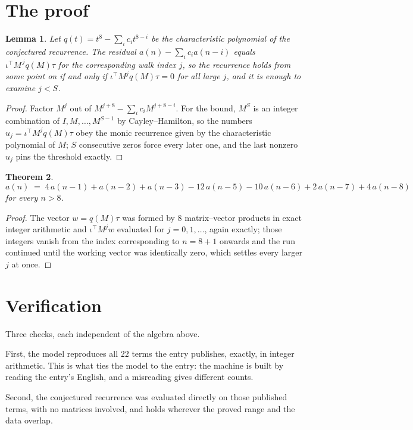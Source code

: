 \documentclass[11pt,a4paper]{article}
\theoremstyle{plain}
\newtheorem{theorem}{Theorem}
\newtheorem{lemma}[theorem]{Lemma}
\theoremstyle{definition}
\begin{document}
\section{The proof}

\begin{lemma}\label{lem:crit}
Let $q(t)=t^{8}-\sum_i c_it^{8-i}$ be the characteristic polynomial of the
conjectured recurrence. The residual $a(n)-\sum_ic_ia(n-i)$ equals
$\iota^{\!\top}M^{\,j}q(M)\tau$ for the corresponding walk index $j$, so the recurrence
holds from some point on if and only if $\iota^{\!\top}M^{j}q(M)\tau=0$ for all large $j$,
and it is enough to examine $j<S$.
\end{lemma}

\begin{proof}
Factor $M^{j}$ out of $M^{j+8}-\sum_ic_iM^{j+8-i}$. For the bound, $M^{S}$
is an integer combination of $I,M,\dots,M^{S-1}$ by Cayley--Hamilton, so the numbers
$u_j=\iota^{\!\top}M^{j}q(M)\tau$ obey the monic recurrence given by the characteristic
polynomial of $M$; $S$ consecutive zeros force every later one, and the last nonzero $u_j$
pins the threshold exactly.
\end{proof}

\begin{theorem}
\[
a(n)\;=\;4\,a(n-1) + a(n-2) + a(n-3) - 12\,a(n-5) - 10\,a(n-6) + 2\,a(n-7) + 4\,a(n-8)
\]
for every $n>8$.
\end{theorem}

\begin{proof}
The vector $w=q(M)\tau$ was formed by $8$ matrix--vector products in exact integer
arithmetic and $\iota^{\!\top}M^{j}w$ evaluated for $j=0,1,\dots$, again exactly; those
integers vanish from the index corresponding to $n=8+1$ onwards and the run continued
until the working vector was identically zero, which settles every larger $j$ at once.
\end{proof}

\section{Verification}

Three checks, each independent of the algebra above.

First, the model reproduces all $22$ terms the entry publishes, exactly, in integer
arithmetic. This is what ties the model to the entry: the machine is built by reading the
entry's English, and a misreading gives different counts.

Second, the conjectured recurrence was evaluated directly on those published terms, with no
matrices involved, and holds wherever the proved range and the data overlap.
\end{document}

